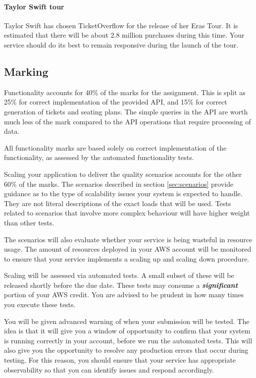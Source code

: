 \documentclass{csse4400}
\begin{document}
\paragraph{Taylor Swift tour}
Taylor Swift has chosen TicketOverflow for the release of her Eras Tour.
It is estimated that there will be about 2.8 million purchases during this time.
Your service should do its best to remain responsive during the launch of the tour.


\subsection{Marking}
Functionality accounts for 40\% of the marks for the assignment.
This is split as 25\% for correct implementation of the provided API,
and 15\% for correct generation of tickets and seating plans.
The simple queries in the API are worth much less of the mark compared to the API operations that require processing of data.

All functionality marks are based solely on correct implementation of the functionality,
as assessed by the automated functionality tests.

Scaling your application to deliver the quality scenarios accounts for the other 60\% of the marks.
The scenarios described in section \ref{sec:scenarios} provide guidance as to the type of scalability issues your system is expected to handle.
They are not literal descriptions of the exact loads that will be used.
Tests related to scenarios that involve more complex behaviour will have higher weight than other tests.

The scenarios will also evaluate whether your service is being wasteful in resource usage.
The amount of resources deployed in your AWS account will be monitored to ensure that your service implements a scaling up and scaling down procedure.

Scaling will be assessed via automated tests.
A small subset of these will be released shortly before the due date.
These tests may consume a \textbf{\emph{significant}} portion of your AWS credit.
You are advised to be prudent in how many times you execute these tests.

You will be given advanced warning of when your submission will be tested.
The idea is that it will give you a window of opportunity to confirm that your system is running correctly in your account,
before we run the automated tests.
This will also give you the opportunity to resolve any production errors that occur during testing.
For this reason,
you should ensure that your service has appropriate observability so that you can identify issues and respond accordingly.
\end{document}
